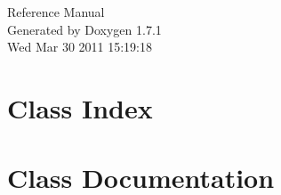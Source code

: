 \documentclass[a4paper]{book}
\begin{document}
\hypersetup{pageanchor=false}
\begin{titlepage}
\vspace*{7cm}
\begin{center}
{\Large Reference Manual}\\
\vspace*{1cm}
{\large Generated by Doxygen 1.7.1}\\
\vspace*{0.5cm}
{\small Wed Mar 30 2011 15:19:18}\\
\end{center}
\end{titlepage}
\clearemptydoublepage
{}
\tableofcontents
\clearemptydoublepage
{}
\hypersetup{pageanchor=true}
\chapter{Class Index}

\chapter{Class Documentation}










\printindex
\end{document}
